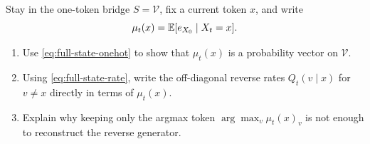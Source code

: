 \documentclass[11pt]{article}
\newif\ifshowsolutions
\newcommand{\SolutionBox}[2][10]{%
  \ifshowsolutions
    \begin{tcolorbox}[stat221panelgray,title={Solution}]
    #2
    \end{tcolorbox}
  \else
    \begin{tcolorbox}[stat221panelgray,unbreakable,title={Workspace}]
    \vspace{#1\baselineskip}
    \end{tcolorbox}
  \fi
}
\begin{document}
\begin{exercise}
\label{ex:posterior-vector-vs-label}
Stay in the one-token bridge \(S=\mathcal{V}\), fix a current token \(x\), and write
\[
  \mu_t(x)=\mathbb{E}[e_{X_0}\mid X_t=x].
\]
\begin{enumerate}[leftmargin=*]
  \item Use \eqref{eq:full-state-onehot} to show that \(\mu_t(x)\) is a probability vector on \(\mathcal{V}\).
  \item Using \eqref{eq:full-state-rate}, write the off-diagonal reverse rates \(Q_t(v\mid x)\) for \(v\neq x\) directly in terms of \(\mu_t(x)\).
  \item Explain why keeping only the argmax token \(\arg\max_v \mu_t(x)_v\) is not enough to reconstruct the reverse generator.
\end{enumerate}
\end{exercise}
\SolutionBox[10]{From \eqref{eq:full-state-onehot},
\[
  \mu_t(x)_v=q_{0\mid t}(X_0=v\mid X_t=x)\ge 0
  \qquad\text{for every }v\in\mathcal{V},
\]
and therefore
\[
  \sum_{v\in\mathcal{V}}\mu_t(x)_v
  =
  \sum_{v\in\mathcal{V}} q_{0\mid t}(X_0=v\mid X_t=x)
  =
  1.
\]
So \(\mu_t(x)\) lies in the simplex.
Equation \eqref{eq:full-state-rate} gives
\[
  Q_t(v\mid x)=c_t\,\mu_t(x)_v,
  \qquad v\neq x.
\]
Thus every off-diagonal rate is one coordinate of the posterior vector.
Keeping only the argmax token loses the sizes of the nonmaximal coordinates and therefore loses the relative jump intensities toward the other destinations.
It also loses the total escape rate
\[
  \sum_{v\neq x} Q_t(v\mid x)=c_t\bigl(1-\mu_t(x)_x\bigr),
\]
so even the diagonal entry cannot be reconstructed from the argmax alone.}
\end{document}
